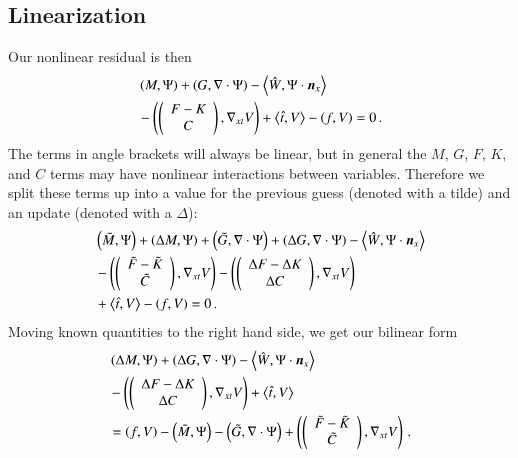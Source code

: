 \documentclass[preprint,12pt]{elsarticle}
\begin{document}
\subsection{Linearization}
Our nonlinear residual is then
\begin{align*}
&\left( M,\Psi \right)+\left( G,\nabla\cdot\Psi \right)-\left\langle \hat W,\Psi\cdot\boldsymbol n_x \right\rangle\\
&-\left( \left( \begin{array}{c} F-K\\ C\\ \end{array} \right),\nabla_{xt} V \right)+\left\langle \hat t,V \right\rangle-\left( f,V \right)=0\,.
\end{align*}
The terms in angle brackets will always be linear, but in general the $M$, $G$, $F$, $K$, and $C$ terms may have nonlinear interactions
between variables.
Therefore we split these terms up into a value for the previous guess (denoted with a tilde) and an update (denoted with a $\Delta$):
\begin{align*}
&\left( \tilde M,\Psi \right) + \left( \Delta M,\Psi \right)
+\left( \tilde G,\nabla\cdot\Psi \right) + \left( \Delta G,\nabla\cdot\Psi \right)
-\left\langle \hat W,\Psi\cdot\boldsymbol n_x \right\rangle\\
&-\left( \left( \begin{array}{c} \tilde F-\tilde K\\ \tilde C\\ \end{array} \right),\nabla_{xt} V \right) - \left( \left( \begin{array}{c} \Delta F-\Delta K\\ \Delta C\\ \end{array} \right),\nabla_{xt} V \right)\\
&+\left\langle \hat t,V \right\rangle-\left( f,V \right)=0\,.
\end{align*}
Moving known quantities to the right hand side, we get our bilinear form
\begin{align*}
&\left( \Delta M,\Psi \right)
+\left( \Delta G,\nabla\cdot\Psi \right)
-\left\langle \hat W,\Psi\cdot\boldsymbol n_x \right\rangle\\
&-\left( \left( \begin{array}{c} \Delta F-\Delta K\\ \Delta C\\ \end{array} \right),\nabla_{xt} V \right)
+\left\langle \hat t,V \right\rangle\\
&=\left( f,V \right)
-\left( \tilde M,\Psi \right) 
-\left( \tilde G,\nabla\cdot\Psi \right) 
+\left( \left( \begin{array}{c} \tilde F-\tilde K\\ \tilde C\\ \end{array} \right),\nabla_{xt} V \right)\,.
\end{align*}
\end{document}
